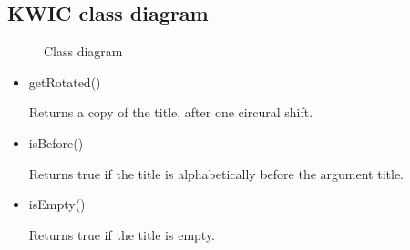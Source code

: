 \documentclass[11pt,a4paper]{article}
\begin{document}
\newpage
\subsection{KWIC class diagram}
     \begin{figure}[htb]
         \begin{center}
             \setlength\fboxsep{0pt}
             \caption{Class diagram}
             \label{fig:class_diag}
        \end{center}
    \end{figure}
\begin{description}
   \begin{itemize}
        \item getRotated()
            \begin{description}
                Returns a copy of the title, after one circural shift.
            \end{description}
         \item isBefore()
            \begin{description}
                Returns true if the title is alphabetically before the argument title.
            \end{description}
        \item isEmpty()
            \begin{description}
                Returns true if the title is empty.
            \end{description}

  \end{itemize}

\end{description}

\newpage
\end{document}
